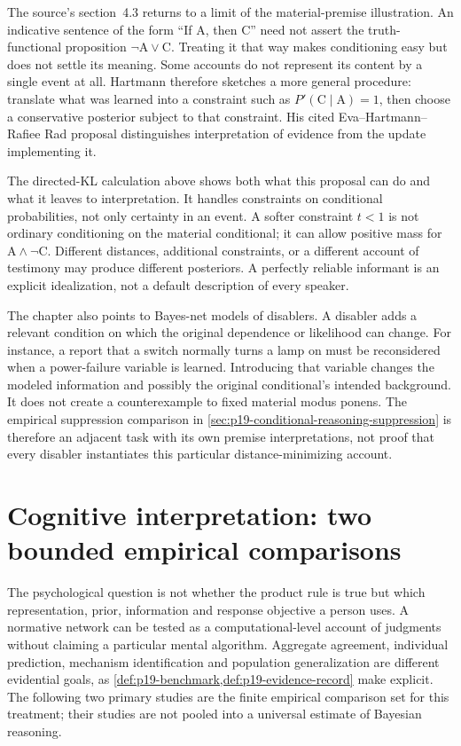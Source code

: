 The source's section~4.3 returns to a limit of the material-premise
illustration. An indicative sentence of the form ``If A, then C'' need
not assert the truth-functional proposition \(\neg\mathrm A\lor\mathrm C\).
Treating it that way makes conditioning easy but does not settle its
meaning. Some accounts do not represent its content by a single event
at all. Hartmann therefore sketches a more general procedure: translate
what was learned into a constraint such as
\(P'(\mathrm C\mid\mathrm A)=1\), then choose a conservative posterior
subject to that constraint. His cited Eva--Hartmann--Rafiee Rad proposal
distinguishes interpretation of evidence from the update implementing it.
\cite[Sec.~4.3, p.~262]{Hartmann2021BayesNets}

The directed-KL calculation above shows both what this proposal can do
and what it leaves to interpretation. It handles constraints on
conditional probabilities, not only certainty in an event. A softer
constraint \(t<1\) is not ordinary conditioning on the material
conditional; it can allow positive mass for
\(\mathrm A\land\neg\mathrm C\). Different distances, additional
constraints, or a different account of testimony may produce different
posteriors. A perfectly reliable informant is an explicit idealization,
not a default description of every speaker.

The chapter also points to Bayes-net models of disablers. A disabler adds
a relevant condition on which the original dependence or likelihood can
change. For instance, a report that a switch normally turns a lamp on
must be reconsidered when a power-failure variable is learned. Introducing
that variable changes the modeled information and possibly the original
conditional's intended background. It does not create a counterexample
to fixed material modus ponens. The empirical suppression comparison in
\cref{sec:p19-conditional-reasoning-suppression} is therefore an adjacent
task with its own premise interpretations, not proof that every disabler
instantiates this particular distance-minimizing account.

\section{Cognitive interpretation: two bounded empirical comparisons}
\label{sec:p16-rat42-cognitive-evidence}

The psychological question is not whether the product rule is true but
which representation, prior, information and response objective a person
uses. A normative network can be tested as a computational-level account
of judgments without claiming a particular mental algorithm. Aggregate
agreement, individual prediction, mechanism identification and population
generalization are different evidential goals, as
\cref{def:p19-benchmark,def:p19-evidence-record} make explicit.
The following two primary studies are the finite empirical comparison
set for this treatment; their studies are not pooled into a universal
estimate of Bayesian reasoning.

